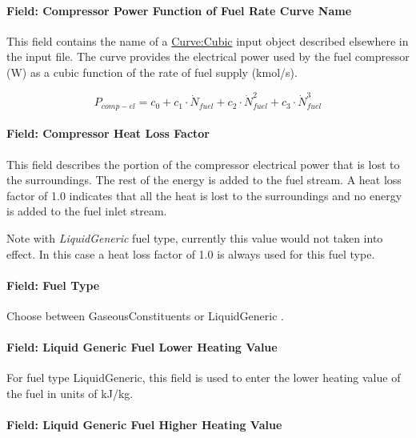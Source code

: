 \paragraph{Field: Compressor Power Function of Fuel Rate Curve Name}\label{field-compressor-power-function-of-fuel-rate-curve-name}

This field contains the name of a \hyperref[curvecubic]{Curve:Cubic} input object described elsewhere in the input file. The curve provides the electrical power used by the fuel compressor (W) as a cubic function of the rate of fuel supply (kmol/s).

\begin{equation}
{P_{comp - el}} = {c_0} + {c_1} \cdot {\dot N_{fuel}} + {c_2} \cdot \dot N_{fuel}^2 + {c_3} \cdot \dot N_{fuel}^3
\end{equation}

\paragraph{Field: Compressor Heat Loss Factor}\label{field-compressor-heat-loss-factor}

This field describes the portion of the compressor electrical power that is lost to the surroundings. The rest of the energy is added to the fuel stream. A heat loss factor of 1.0 indicates that all the heat is lost to the surroundings and no energy is added to the fuel inlet stream.

Note with \emph{LiquidGeneric} fuel type, currently this value would not taken into effect. In this case a heat loss factor of 1.0 is always used for this fuel type.

\paragraph{Field: Fuel Type}\label{field-fuel-type-3}

Choose between GaseousConstituents or LiquidGeneric .

\paragraph{Field: Liquid Generic Fuel Lower Heating Value}\label{field-liquid-generic-fuel-lower-heating-value}

For fuel type LiquidGeneric, this field is used to enter the lower heating value of the fuel in units of kJ/kg.

\paragraph{Field: Liquid Generic Fuel Higher Heating Value}\label{field-liquid-generic-fuel-higher-heating-value}

